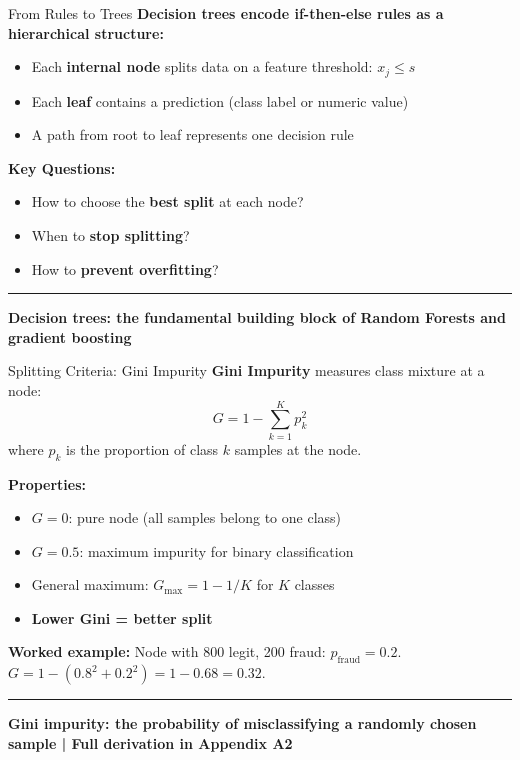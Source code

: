 \documentclass[8pt,aspectratio=169]{beamer}
\newcommand{\bottomnote}[1]{%
\vfill
\vspace{-2mm}
\textcolor{mllavender2}{\rule{\textwidth}{0.4pt}}
\vspace{1mm}
\footnotesize
\textbf{#1}
}
\begin{document}
\begin{frame}[t]{From Rules to Trees}
\textbf{Decision trees encode if-then-else rules as a hierarchical structure:}
\begin{itemize}
\item Each \textbf{internal node} splits data on a feature threshold: $x_j \leq s$
\item Each \textbf{leaf} contains a prediction (class label or numeric value)
\item A path from root to leaf represents one decision rule
\end{itemize}

\vspace{0.5em}
\textbf{Key Questions:}
\begin{itemize}
\item How to choose the \textbf{best split} at each node?
\item When to \textbf{stop splitting}?
\item How to \textbf{prevent overfitting}?
\end{itemize}
\bottomnote{Decision trees: the fundamental building block of Random Forests and gradient boosting}
\end{frame}

\begin{frame}[t]{Splitting Criteria: Gini Impurity}
\textbf{Gini Impurity} measures class mixture at a node:
\[
G = 1 - \sum_{k=1}^{K} p_k^2
\]
where $p_k$ is the proportion of class $k$ samples at the node.

\vspace{0.5em}
\textbf{Properties:}
\begin{itemize}
\item $G = 0$: pure node (all samples belong to one class)
\item $G = 0.5$: maximum impurity for binary classification
\item General maximum: $G_{\max} = 1 - 1/K$ for $K$ classes
\item \textbf{Lower Gini = better split}
\end{itemize}
\vspace{0.3em}
\textbf{Worked example:} Node with 800 legit, 200 fraud: $p_{\text{fraud}} = 0.2$. $G = 1 - (0.8^2 + 0.2^2) = 1 - 0.68 = 0.32$.
\bottomnote{Gini impurity: the probability of misclassifying a randomly chosen sample | Full derivation in Appendix A2}
\end{frame}
\end{document}

